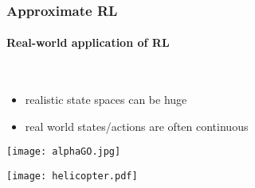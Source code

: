 \subsubsection{Approximate RL}
\paragraph{Real-world application of RL}\mbox{}\\
	\begin{minipage}{\textwidth}
		\begin{minipage}{0.8\textwidth}
			\begin{itemize}
				\item  realistic state spaces can be huge 
				\vspace{4mm}
				\item real world states/actions are often continuous
			\end{itemize}
	
			\vspace{0mm}
			\begin{center}
				\texttt{[image: alphaGO.jpg]}
			\end{center}
		\end{minipage}
		\begin{minipage}{.19\textwidth}
			
				\texttt{[image: helicopter.pdf]}
			
		\end{minipage}
	\end{minipage}

